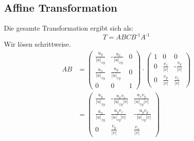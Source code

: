 \documentclass[a4paper]{scrartcl}
\begin{document}
\subsection*{Affine Transformation}
Die gesamte Transformation ergibt sich als:
\begin{equation*}
T = ABCB^{\text{-}1}A^{\text{-}1}
\end{equation*}
Wir lösen schrittweise.
\begin{align*}
AB & = 
\begin{pmatrix} 
\frac{u_y}{\left|u\right|_{xy}} & \text{-} \frac{u_x}{\left|u\right|_{xy}} & 0 \\ 
\frac{u_x}{\left|u\right|_{xy}} & \frac{u_y}{\left|u\right|_{xy}} & 0 \\ 
0 & 0 & 1
\end{pmatrix}
\cdot
\begin{pmatrix} 
1 & 0 & 0 \\ 
0 & \frac{v_z}{\left|v\right|} & \text{-} \frac{v_y}{\left|v\right|} \\ 
0 & \frac{v_y}{\left|v\right|} & \frac{v_z}{\left|v\right|} 
\end{pmatrix}
\\ & =
\begin{pmatrix} 
\frac{u_y}{\left|u\right|_{xy}} & \text{-} \frac{u_x v_z}{\left|u\right|_{xy}\left|v\right|} & \frac{u_x v_y}{\left|u\right|_{xy}\left|v\right|} \\
\frac{u_x}{\left|u\right|_{xy}} & \frac{u_y v_z}{\left|u\right|_{xy}\left|v\right|} & \text{-} \frac{u_y v_y}{\left|u\right|_{xy}\left|v\right|} \\ 
0 & \frac{v_y}{\left|v\right|} & \frac{v_z}{\left|v\right|} 
\end{pmatrix}
\end{align*}
\end{document}
